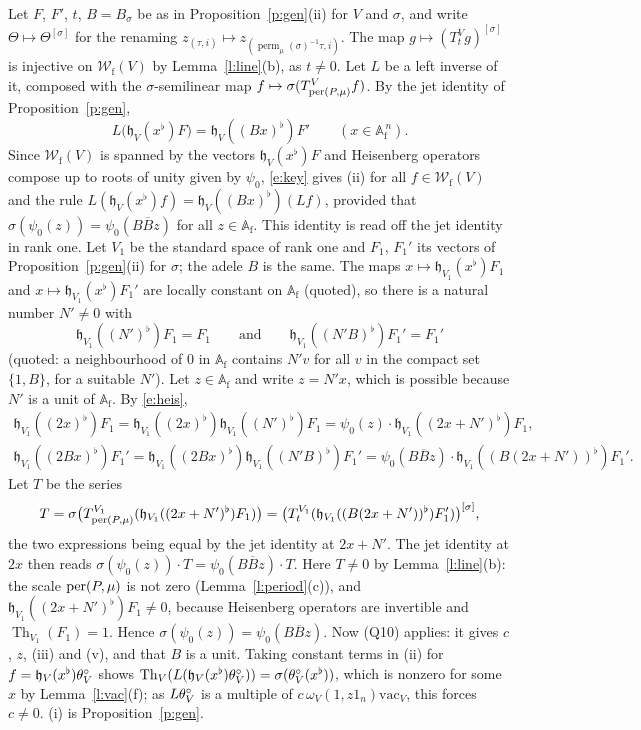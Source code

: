\documentclass[11pt,a4paper]{article}
\makeatletter
\theoremstyle{plainx}
\theoremstyle{uprightx}
\renewenvironment{proof}[1][Proof]{\par\pushQED{\qed}\normalfont\topsep0pt\partopsep0pt
  \trivlist\item[\hskip\labelsep\itshape #1.]\ignorespaces}{\popQED\endtrivlist\@endpefalse}
\newcommand{\cj}[1]{\overline{#1}}
\newcommand{\Af}{\mathbb{A}_{\mathrm{f}}}
\newcommand{\prm}[2]{\operatorname{perm}_{#1}(#2)}
\newcommand{\Wf}[1]{\mathcal{W}_{\mathrm{f}}(#1)}
\newcommand{\vac}[1]{\mathrm{vac}_{#1}}
\newcommand{\heis}[2]{\mathfrak{h}_{#1}(#2)}
\newcommand{\fv}[1]{#1^{\flat}}
\newcommand{\Th}[1]{\operatorname{Th}_{#1}}
\newcommand{\weil}[1]{\omega_{#1}}
\newcommand{\jet}[3]{T^{#1}_{#2}#3}
\makeatother
\begin{document}
\begin{proof}[Proof of Theorem B]
Let $F$, $F'$, $t$, $B=B_\sigma$ be as in Proposition~\ref{p:gen}(ii) for $V$ and $\sigma$, and write
$\Theta\mapsto\Theta^{[\sigma]}$ for the renaming $z_{(\tau,i)}\mapsto z_{(\prm{\mu}{\sigma}^{-1}\tau,i)}$. The map
$g\mapsto(\jet{V}{t}{g})^{[\sigma]}$ is injective on $\Wf{V}$ by Lemma~\ref{l:line}(b), as $t\ne0$. Let $L$ be a
left inverse of it, composed with the $\sigma$-semilinear map $f\mapsto\sigma(\jet{V}{\per{P}{\mu}}{f})$. By the jet
identity of Proposition~\ref{p:gen},
\begin{equation}\label{e:key}
L\bigl(\heis{V}{\fv{x}}F\bigr)=\heis{V}{\fv{(Bx)}}F'\qquad(x\in\Af^{\,n}).
\end{equation}
Since $\Wf{V}$ is spanned by the vectors $\heis{V}{\fv x}F$ and Heisenberg operators compose up to roots of unity
given by $\psi_0$, \eqref{e:key} gives (ii) for all $f\in\Wf{V}$ and the rule
$L(\heis{V}{\fv x}f)=\heis{V}{\fv{(Bx)}}(Lf)$, provided that $\sigma(\psi_0(z))=\psi_0(B\cj Bz)$ for all $z\in\Af$.
This identity is read off the jet identity in rank one. Let $V_1$ be the standard space of rank one and
$F_1$, $F_1'$ its vectors of Proposition~\ref{p:gen}(ii) for $\sigma$; the adele $B$ is the same. The maps
$x\mapsto\heis{V_1}{\fv{x}}F_1$ and $x\mapsto\heis{V_1}{\fv{x}}F_1'$ are locally constant on $\Af$ (quoted), so
there is a natural number $N'\ne0$ with
\[\heis{V_1}{\fv{(N')}}F_1=F_1\qquad\text{and}\qquad\heis{V_1}{\fv{(N'B)}}F_1'=F_1'\]
(quoted: a neighbourhood of $0$ in $\Af$ contains $N'v$ for all $v$ in the compact set $\{1,B\}$, for a suitable
$N'$). Let $z\in\Af$ and write $z=N'x$, which is possible because $N'$ is a unit of $\Af$. By \eqref{e:heis},
\begin{gather*}
\heis{V_1}{\fv{(2x)}}F_1=\heis{V_1}{\fv{(2x)}}\heis{V_1}{\fv{(N')}}F_1=\psi_0(z)\cdot\heis{V_1}{\fv{(2x+N')}}F_1,\\
\heis{V_1}{\fv{(2Bx)}}F_1'=\heis{V_1}{\fv{(2Bx)}}\heis{V_1}{\fv{(N'B)}}F_1'=\psi_0(B\cj Bz)\cdot\heis{V_1}{\fv{(B(2x+N'))}}F_1' .
\end{gather*}
Let $T$ be the series
\[T=\sigma\bigl(\jet{V_1}{\per{P}{\mu}}{(\heis{V_1}{\fv{(2x+N')}}F_1)}\bigr)=\bigl(\jet{V_1}{t}{(\heis{V_1}{\fv{(B(2x+N'))}}F_1')}\bigr)^{[\sigma]},\]
the two expressions being equal by the jet identity at $2x+N'$. The jet identity at $2x$ then reads
$\sigma(\psi_0(z))\cdot T=\psi_0(B\cj Bz)\cdot T$. Here $T\ne0$ by Lemma~\ref{l:line}(b): the scale
$\mathrm{per}(P,\mu)$ is not zero (Lemma~\ref{l:period}(c)), and $\heis{V_1}{\fv{(2x+N')}}F_1\ne0$, because Heisenberg
operators are invertible and $\Th{V_1}(F_1)=1$. Hence $\sigma(\psi_0(z))=\psi_0(B\cj Bz)$. Now (Q10) applies: it gives $c$, $z$, (iii) and
(v), and that $B$ is a unit. Taking constant terms in (ii) for $f=\heis{V}{\fv x}\intvac{V}$ shows
$\Th{V}(L(\heis{V}{\fv{x}}\intvac{V}))=\sigma(\intvac{V}(\fv x))$, which is nonzero for some $x$ by
Lemma~\ref{l:vac}(f); as $L\theta^{\circ}_{V}$ is a multiple of $c\,\weil{V}(1,z1_n)\vac{V}$, this forces $c\ne0$. (i) is
Proposition~\ref{p:gen}.


\end{proof}
\end{document}

